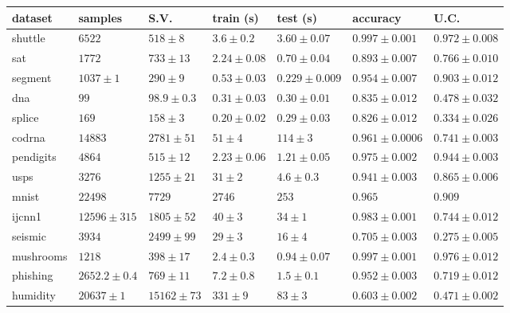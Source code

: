 \begin{tabular}{|l|llllll|}
\hline
dataset & samples & S.V. & train (s) & test (s) & accuracy & U.C. \\
\hline
shuttle  & $    6522$ & $         518\pm      8$ & $        3.6\pm      0.2$ & $        3.60\pm    0.07$ & $       0.997\pm  0.001$ & $       0.972\pm   0.008$\\
sat  & $    1772$ & $         733\pm       13$ & $        2.24\pm    0.08$ & $       0.70\pm    0.04$ & $       0.893\pm   0.007$ & $       0.766\pm     0.010$\\
segment  & $    1037\pm     1$ & $         290\pm        9$ & $       0.53\pm    0.03$ & $       0.229\pm   0.009$ & $       0.954\pm   0.007$ & $       0.903\pm    0.012$\\
dna  & $          99$ & $        98.9\pm     0.3$ & $       0.31\pm    0.03$ & $       0.30\pm    0.01$ & $       0.835\pm    0.012$ & $       0.478\pm    0.032$\\
splice  & $         169$ & $         158\pm      3$ & $         0.20\pm    0.02$ & $       0.29\pm     0.03$ & $       0.826\pm    0.012$ & $       0.334\pm    0.026$\\
codrna  & $    14883$ & $    2781\pm       51$ & $        51\pm      4$ & $         114\pm      3$ & $       0.961\pm  0.0006$ & $       0.741\pm   0.003$\\
pendigits  & $    4864$ & $         515\pm       12$ & $        2.23\pm    0.06$ & $        1.21\pm    0.05$ & $       0.975\pm   0.002$ & $       0.944\pm   0.003$\\
usps  & $    3276$ & $    1255\pm       21$ & $        31\pm      2$ & $        4.6\pm     0.3$ & $       0.941\pm   0.003$ & $       0.865\pm   0.006$\\
mnist & $ 22498$ & $7729$ & $2746$ & $253$ & $0.965$ & $0.909$ \\
ijcnn1  & $    12596\pm  315$ & $    1805\pm       52$ & $          40\pm      3$ & $          34\pm      1$ & $       0.983\pm   0.001$ & $       0.744\pm    0.012$\\
seismic  & $    3934$ & $     2499\pm       99$ & $        29\pm      3$ & $        16\pm      4$ & $       0.705\pm   0.003$ & $       0.275\pm   0.005$\\
mushrooms  & $    1218$ & $         398\pm       17$ & $         2.4\pm     0.3$ & $       0.94\pm    0.07$ & $       0.997\pm   0.001$ & $       0.976\pm    0.012$\\
phishing  & $    2652.2\pm     0.4$ & $         769\pm       11$ & $        7.2\pm     0.8$ & $        1.5\pm     0.1$ & $       0.952\pm   0.003$ & $       0.719\pm    0.012$\\
humidity  & $    20637\pm     1$ & $    15162\pm       73$ & $         331\pm        9$ & $        83\pm      3$ & $       0.603\pm   0.002$ & $       0.471\pm    0.002$\\
\hline
\end{tabular}

